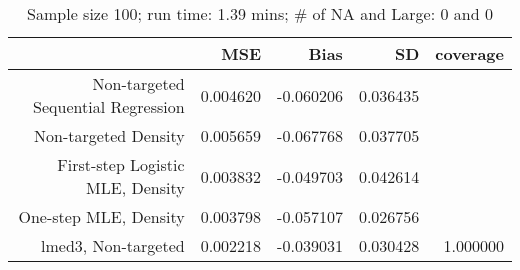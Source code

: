 \begin{table}[ht]
\centering
\caption{Sample size 100; run time: 1.39 mins; # of NA and Large:  0 and 0} 
\begin{tabular}{rrrrr}
  \hline
 & MSE & Bias & SD & coverage \\ 
  \hline
Non-targeted Sequential Regression & 0.004620 & -0.060206 & 0.036435 &  \\ 
  Non-targeted Density & 0.005659 & -0.067768 & 0.037705 &  \\ 
  First-step Logistic MLE, Density & 0.003832 & -0.049703 & 0.042614 &  \\ 
  One-step MLE, Density & 0.003798 & -0.057107 & 0.026756 &  \\ 
  lmed3, Non-targeted & 0.002218 & -0.039031 & 0.030428 & 1.000000 \\ 
   \hline
\end{tabular}
\end{table}
